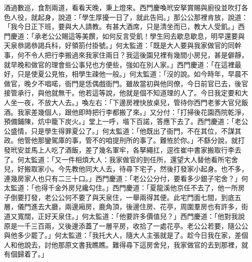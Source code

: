 酒過數巡，食割兩道，看看天晚，秉上燈來。西門慶喚玳安拏賞賜與廚役並吹打各色人役，就起身，說道：「學生厚擾一日了，就此告囘。」那公公那裡肯放，說道：「我今日正下班，要與大人請教。有甚大酒席，只是清坐而已，教大人受飢。」西門慶道：「承老公公賜這等美饌，如何反言受飢！學生囘去歇息歇息，明早還要與天泉叅謁叅謁兵科，好領箚付掛號。」何太監道：「既是大人要與我家做官的同幹事，何不令人把行李搬過來我家住兩日？我這後園兒裡有幾間小房兒，甚是僻靜，就早晚和做官的理會些公事兒也方便些，強如在別人家。」西門慶道：「在這裡最好，只是使夏公見恠，相學生疎他一般。」何太監道：「沒的說。如今時年，早晨不做官，晚夕不唱喏，衙門是恁偶戲衙門。{}雖故當初與他同僚，今日前官已去，後官接管承行，與他就無干。他若這等說，他就是個不知道理的人了。{}今日我定要和大人坐一夜，不放大人去。」喚左右：「下邊房裡快放桌兒，管待你西門老爹大官兒飯酒。我家差幾個人，跟他即時把行李都搬了來。」又分付：「打掃後花園西院乾淨，預備鋪陳，炕中籠下炭火。」堂上一呼，堦下百諾，答應下去了。西門慶道：「老公公盛情，只是學生得罪夏公了。」何太監道：「他既出了衙門，不在其位，不謀其政。他管他那鑾駕庫的事，{}管不的咱提刑所的事了。難恠於你。」不繇分說，就打發玳安並馬上人吃了酒飯，差了幾名軍牢，各拏繩扛，逕徃崔中書家搬取行李去了。何太監道：「又一件相煩大人：我家做官的到任所，還望大人替他看所宅舍兒，好搬取家小。今先教他同大人去，待尋下宅子，然後打發家小起身。也不多，連幾房家人也只有二三十口。」西門慶道：「老公公分付，要看多少銀子宅舍？」何太監道：「也得千金外房兒纔勾住。」西門慶道：「夏龍溪他京任不去了，他一所房子倒要打發，老公公何不要了與天泉住，一舉兩得其便。此宅門面七間，到底五層，儀門進去大廳，兩邊廂房，鹿角頂，後邊住房、花亭，周圍羣房也有許多，街道又寬闊，正好天泉住。」何太監道：「他要許多價值兒？」西門慶道：「他對我說原是一千三百兩，又後邊添蓋了一層平房，收拾了一處花亭。老公公若要，隨公公與他多少罷了。」何太監道：「我托大人，隨大人主張就是了。趁今日我在家，差個人和他說去，討他那原文書我瞧瞧。難得尋下這房舍兒，我家做官的去到那裡，就有個歸着了。」

